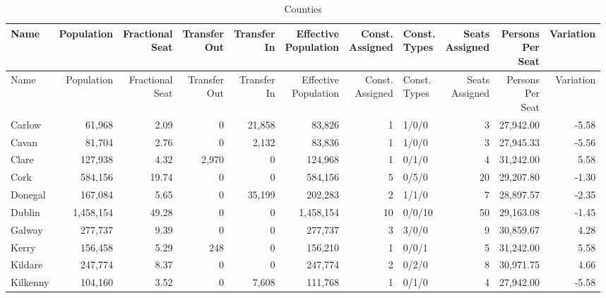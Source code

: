 \documentclass[a4paper]{article}
\begin{document}
\begin{longtable}{lrrrrrrlrrr}
\caption{Counties}
\\ \toprule
Name &Population &\shortstack{Fractional\\Seat} &\shortstack{Transfer\\Out} &\shortstack{Transfer\\In} &\shortstack{Effective\\Population} &\shortstack{Const.\\Assigned} &\shortstack{Const.\\Types} &\shortstack{Seats\\Assigned} &\shortstack{Persons\\Per\\Seat} &Variation \\ \midrule
\endfirsthead
\toprule
Name &Population &\shortstack{Fractional\\Seat} &\shortstack{Transfer\\Out} &\shortstack{Transfer\\In} &\shortstack{Effective\\Population} &\shortstack{Const.\\Assigned} &\shortstack{Const.\\Types} &\shortstack{Seats\\Assigned} &\shortstack{Persons\\Per\\Seat} &Variation \\ \midrule
\endhead
\bottomrule
\endfoot
Carlow&61,968& 2.09&0&21,858&83,826&1&1/0/0&3&27,942.00&-5.58\\ 
Cavan&81,704& 2.76&0&2,132&83,836&1&1/0/0&3&27,945.33&-5.56\\ 
Clare&127,938& 4.32&2,970&0&124,968&1&0/1/0&4&31,242.00& 5.58\\ 
Cork&584,156&19.74&0&0&584,156&5&0/5/0&20&29,207.80&-1.30\\ 
Donegal&167,084& 5.65&0&35,199&202,283&2&1/1/0&7&28,897.57&-2.35\\ 
Dublin&1,458,154&49.28&0&0&1,458,154&10&0/0/10&50&29,163.08&-1.45\\ 
Galway&277,737& 9.39&0&0&277,737&3&3/0/0&9&30,859.67& 4.28\\ 
Kerry&156,458& 5.29&248&0&156,210&1&0/0/1&5&31,242.00& 5.58\\ 
Kildare&247,774& 8.37&0&0&247,774&2&0/2/0&8&30,971.75& 4.66\\ 
Kilkenny&104,160& 3.52&0&7,608&111,768&1&0/1/0&4&27,942.00&-5.58\\ 

\end{longtable}
\end{document}
